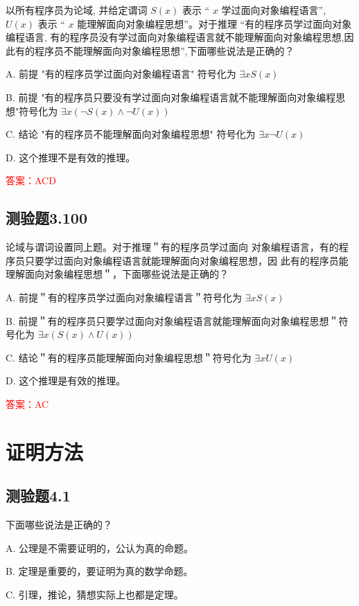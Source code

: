 \documentclass[UTF8, heading=true]{ctexart}
\begin{document}
以所有程序员为论域, 并给定谓词 $S(x)$ 表示 “ $x$ 学过面向对象编程语言”, $U(x)$ 表示 “ $x$ 能理解面向对象编程思想”。对于推理 “有的程序员学过面向对象编程语言, 有的程序员没有学过面向对象编程语言就不能理解面向对象编程思想,因此有的程序员不能理解面向对象编程思想”,下面哪些说法是正确的？

A. 前提 "有的程序员学过面向对象编程语言" 符号化为 $\exists x S(x)$

B. 
前提 "有的程序员只要没有学过面向对象编程语言就不能理解面向对象编程思想"符号化为 $\exists x(\neg S(x) \wedge \neg U(x))$

C. 结论 "有的程序员不能理解面向对象编程思想" 符号化为 $\exists x \neg U(x)$

D. 这个推理不是有效的推理。

\textcolor{red}{答案：ACD}

\subsection{测验题3.100}

论域与谓词设置同上题。对于推理＂有的程序员学过面向
对象编程语言，有的程序员只要学过面向对象编程语言就能理解面向对象编程思想，因
此有的程序员能理解面向对象编程思想＂，下面哪些说法是正确的？

A. 前提＂有的程序员学过面向对象编程语言＂符号化为 $\exists x S(x)$

B. 前提＂有的程序员只要学过面向对象编程语言就能理解面向对象编程思想＂符号化为 $\exists x(S(x) \wedge U(x))$

C. 结论＂有的程序员能理解面向对象编程思想＂符号化为 $\exists x U(x)$

D. 这个推理是有效的推理。

\textcolor{red}{答案：AC}


\clearpage

\section{证明方法}

\subsection{测验题4.1}

下面哪些说法是正确的？

A. 公理是不需要证明的，公认为真的命题。

B. 定理是重要的，要证明为真的数学命题。

C. 引理，推论，猜想实际上也都是定理。
\end{document}

